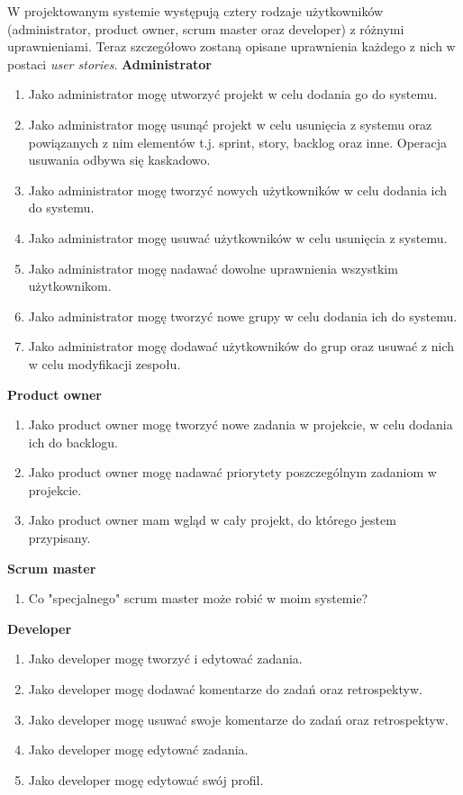 \documentclass[a4paper,11pt]{article}
\begin{document}
W projektowanym systemie występują cztery rodzaje użytkowników (administrator, product owner, scrum master oraz developer) z różnymi uprawnieniami. Teraz szczegółowo zostaną opisane uprawnienia każdego z nich w postaci \textit{user stories}.
	\newline
	\newline
	\textbf{Administrator}
	\begin{enumerate}		
		\item Jako administrator mogę utworzyć projekt w celu dodania go do systemu.
		\item Jako administrator mogę usunąć projekt w celu usunięcia z systemu oraz powiązanych z nim elementów t.j. sprint, story, backlog oraz inne. Operacja usuwania odbywa się kaskadowo.
		\item Jako administrator mogę tworzyć nowych użytkowników w celu dodania ich do systemu.
		\item Jako administrator mogę usuwać użytkowników w celu usunięcia z systemu.
		\item Jako administrator mogę nadawać dowolne uprawnienia wszystkim użytkownikom.
		\item Jako administrator mogę tworzyć nowe grupy w celu dodania ich do systemu.
		\item Jako administrator mogę dodawać użytkowników do grup oraz usuwać z nich w celu modyfikacji zespołu.		 
	\end{enumerate}		
	\textbf{Product owner}
	\begin{enumerate}		
		\item Jako product owner mogę tworzyć nowe zadania w projekcie, w celu dodania ich do backlogu.
		\item Jako product owner mogę nadawać priorytety poszczególnym zadaniom w projekcie.
		\item Jako product owner mam wgląd w cały projekt, do którego jestem przypisany.
	\end{enumerate}	
	\textbf{Scrum master}
	\begin{enumerate}		
		\item Co "specjalnego" scrum master może robić w moim systemie?
	\end{enumerate}
	\textbf{Developer}
	\begin{enumerate}		
		\item Jako developer mogę tworzyć i edytować zadania.
		\item Jako developer mogę dodawać komentarze do zadań oraz retrospektyw.
		\item Jako developer mogę usuwać swoje komentarze do zadań oraz retrospektyw.
		\item Jako developer mogę edytować zadania.
		\item Jako developer mogę edytować swój profil.
	\end{enumerate}
	
\end{document}
